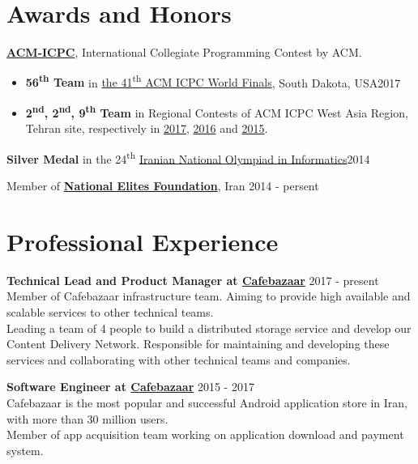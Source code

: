 \documentclass[margin]{res}
\begin{document}
\begin{resume}
\section{Awards and Honors}
	{\bf \href{http://icpc.baylor.edu/}{ACM-ICPC}}, International Collegiate Programming Contest by ACM.
	\vspace{2mm}
	\begin{itemize}

	\item {\bf 56\textsuperscript{th} Team} in 
	\href{https://icpc.baylor.edu/community/results-2017}{the 41\textsuperscript{th} ACM ICPC World Finals}, 
	South Dakota, USA\hfill 2017

	\item {\bf 2\textsuperscript{nd}, 2\textsuperscript{nd}, 9\textsuperscript{th} Team} in Regional Contests of ACM ICPC West Asia Region,
	Tehran site, respectively in 
	\href{http://icpc.sharif.edu/acmicpc17/scoreboard/}{2017}, 
	\href{http://icpc.sharif.edu/acmicpc16/scoreboard/}{2016} and 
	\href{http://icpc.sharif.edu/acmicpc15/scoreboard/}{2015}.

    \end{itemize}

    {\bf Silver Medal} in the 24\textsuperscript{th} \href{http://inoi.ir/}{Iranian National Olympiad in Informatics}\hfill 2014

    Member of \href{https://www.bmn.ir/}{{\bf National Elites Foundation}}, Iran \hfill 2014 - persent

\section{Professional Experience}
    {\bf Technical Lead and Product Manager at \href{https://cafebazaar.ir/}{Cafebazaar}} \hfill 2017 - present
    \\ Member of Cafebazaar infrastructure team. Aiming to provide high available and scalable services to other technical teams. 
    \\Leading a team of 4 people to build a distributed storage service and develop our Content Delivery Network. Responsible for maintaining and developing these services and collaborating with other technical teams and companies.
    
    {\bf Software Engineer at \href{https://cafebazaar.ir/}{Cafebazaar}} \hfill 2015 - 2017
    \\ Cafebazaar is the most popular and successful Android application store in Iran, with more than 30 million users.
    \\ Member of app acquisition team working on application download and payment system.
    

\end{resume}
\end{document}
